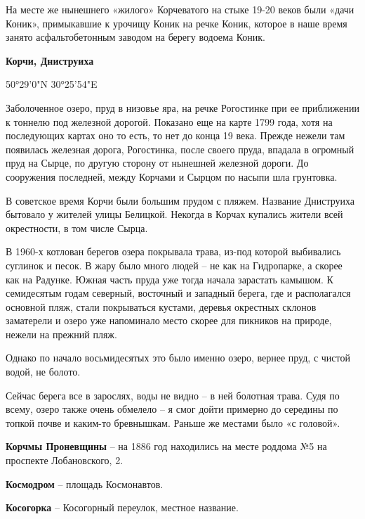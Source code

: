 На месте же нынешнего «жилого» Корчеватого на стыке 19-20 веков были «дачи Коник», примыкавшие к урочищу Коник на речке Коник, которое в наше время занято асфальтобетонным заводом на берегу водоема Коник.\\

\medskip

\textbf{Корчи, Дниструиха}

50°29'0"N 30°25'54"E

Заболоченное озеро, пруд в низовье яра, на речке Рогостинке при ее приближении к тоннелю под железной дорогой. Показано еще на карте 1799 года, хотя на последующих картах оно то есть, то нет до конца 19 века. Прежде нежели там появилась железная дорога, Рогостинка, после своего пруда, впадала в огромный пруд на Сырце, по другую сторону от нынешней железной дороги. До сооружения последней, между Корчами и Сырцом по насыпи шла грунтовка.

В советское время Корчи были большим прудом с пляжем. Название Дниструиха бытовало у жителей улицы Белицкой. Некогда в Корчах купались жители всей окрестности, в том числе Сырца.

В 1960-х котлован берегов озера покрывала трава, из-под которой выбивались суглинок и песок. В жару было много людей – не как на Гидропарке, а скорее как на Радунке. Южная часть пруда уже тогда начала зарастать камышом. К семидесятым годам северный, восточный и западный берега, где и располагался основной пляж, стали покрываться кустами, деревья окрестных склонов заматерели и озеро уже напоминало место скорее для пикников на природе, нежели на прежний пляж.

Однако по начало восьмидесятых это было именно озеро, вернее пруд, с чистой водой, не болото.

Сейчас берега все в зарослях, воды не видно – в ней болотная трава. Судя по всему, озеро также очень обмелело – я смог дойти примерно до середины по топкой почве и каким-то бревнышкам. Раньше же местами было «с головой».\\

\medskip

\textbf{Корчмы Проневщины} – на 1886 год находились на месте роддома №5 на проспекте Лобановского, 2.\\

\medskip


\textbf{Космодром} – площадь Космонавтов.\\

\medskip

\textbf{Косогорка} – Косогорный переулок, местное название.\\


